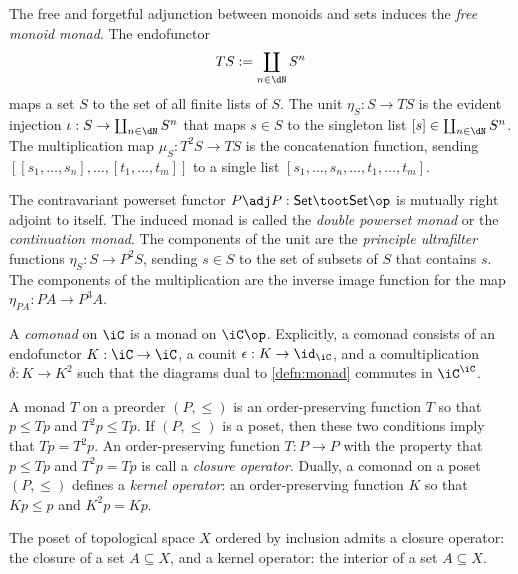 \documentclass{amsart}
\begin{document}
\begin{eg}
  The free and forgetful adjunction between monoids and sets induces the \emph{free monoid monad}.
  The endofunctor
  \[
    TS := \coprod_{n \in \dN}S^{n}
  \]
  maps a set $S$ to the set of all finite lists of $S$.
  The unit $\eta_{S} : S \to TS$ is the evident injection $\iota : S \to \coprod_{n \in \dN}S^{n}$ that maps $s \in S$ to the singleton list $[s] \in \coprod_{n \in \dN}S^{n}$.
  The multiplication map $\mu_{S} : T^{2}S \to TS$ is the concatenation function, sending $[[s_{1},\ldots,s_{n}],\ldots,[t_{1},\ldots,t_{m}]]$ to a single list $[s_{1},\ldots,s_{n},\ldots,t_{1},\ldots,t_{m}]$.
\end{eg}

\begin{eg}
  The contravariant powerset functor $P \adj P : \mathsf{Set} \toot \mathsf{Set}\op$ is mutually right adjoint to itself.
  The induced monad is called the \emph{double powerset monad} or the \emph{continuation monad}.
  The components of the unit are the \emph{principle ultrafilter} functions $\eta_{S} : S \to P^{2}S$, sending $s \in S$ to the set of subsets of $S$ that contains $s$.
  The components of the multiplication are the inverse image function for the map $\eta_{PA} : PA \to P^{3}A$.
\end{eg}

\begin{defn}
  A \emph{comonad} on $\iC$ is a monad on $\iC\op$.
  Explicitly, a comonad consists of an endofunctor $K : \iC \to \iC$, a counit $\epsilon : K \to \id_{\iC}$, and a comultiplication $\delta : K \to K^{2}$ such that the diagrams dual to \cref{defn:monad} commutes in $\iC^{\iC}$.
\end{defn}

\begin{eg}
  A monad $T$ on a preorder $(P, \leq)$ is an order-preserving function $T$ so that $p \leq Tp$ and $T^{2}p \leq Tp$.
  If $(P, \leq)$ is a poset, then these two conditions imply that $Tp = T^{2}p$.
  An order-preserving function $T : P \to P$ with the property that $p \leq Tp$ and $T^{2}p = Tp$ is call a \emph{closure operator}.
  Dually, a comonad on a poset $(P, \leq)$ defines a \emph{kernel operator}: an order-preserving function $K$ so that $Kp \leq p$ and $K^{2}p = Kp$.

  The poset of topological space $X$ ordered by inclusion admits a closure operator: the closure of a set $A \subseteq X$, and a kernel operator: the interior of a set $A \subseteq X$.
\end{eg}
\end{document}

